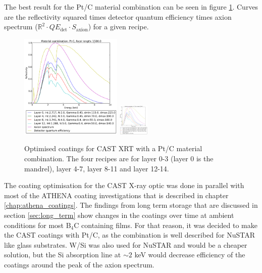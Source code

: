 The best result for the Pt/C material combination can be seen in figure \ref{fig:pt-c_optimized_recipes}. Curves are the reflectivity squared times detector quantum efficiency times axion spectrum ($\mathbb{R}^2\cdot QE_{\text{det}}\cdot S_{\text{axion}}$) for a given recipe.

\begin{figure}[htbp]
  \centering
    \includegraphics[height=5cm]{figures/cast/pt-c_optimized_recipes1.pdf}
    \includegraphics[height=1.5cm]{figures/cast/pt-c_optimized_recipes2.pdf}
  \caption{\footnotesize Optimised coatings for CAST XRT with a Pt/C material combination. The four recipes are for layer 0-3 (layer 0 is the mandrel), layer 4-7, layer 8-11 and layer 12-14.}
  \label{fig:pt-c_optimized_recipes}
\end{figure}

The coating optimisation for the CAST X-ray optic was done in parallel with most of the ATHENA coating investigations that is described in chapter \ref{chap:athena_coatings}. The findings from long term storage that are discussed in section \ref{sec:long_term} show changes in the coatings over time at ambient conditions for most B$_4$C containing films. For that reason, it was decided to make the CAST coatings with Pt/C, as the combination is well described for NuSTAR like glass substrates. W/Si was also used for NuSTAR and would be a cheaper solution, but the Si absorption line at $\sim2$ keV would decrease efficiency of the coatings around the peak of the axion spectrum.

